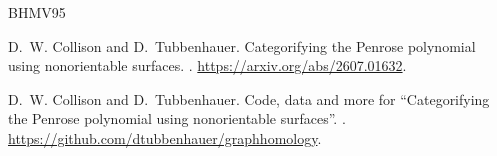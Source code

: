 \documentclass[a4paper,11pt]{amsart}
\begin{document}
%
%


\begin{thebibliography}{BHMV95}


D.~W. Collison and D.~Tubbenhauer.
\newblock Categorifying the Penrose polynomial using nonorientable surfaces.
.
\newblock \url{https://arxiv.org/abs/2607.01632}.


D.~W. Collison and D.~Tubbenhauer.
\newblock Code, data and more for ``Categorifying the Penrose polynomial using nonorientable surfaces''.
.
\newblock \url{https://github.com/dtubbenhauer/graphhomology}.


\end{thebibliography}
\end{document}
